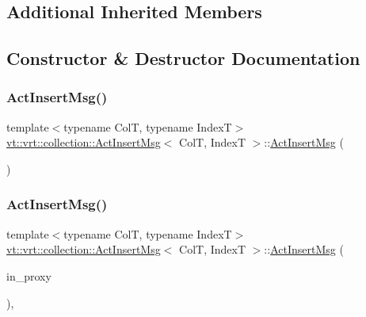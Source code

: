 \subsection*{Additional Inherited Members}


\subsection{Constructor \& Destructor Documentation}
\mbox{\label{structvt_1_1vrt_1_1collection_1_1_act_insert_msg_acd0c4f8868194e27580d9bf5d748bb14}} 
\subsubsection{\texorpdfstring{Act\+Insert\+Msg()}{ActInsertMsg()}\hspace{0.1cm}{\footnotesize\ttfamily [1/2]}}
{\footnotesize\ttfamily template$<$typename ColT, typename IndexT$>$ \\
\hyperlink{structvt_1_1vrt_1_1collection_1_1_act_insert_msg}{vt\+::vrt\+::collection\+::\+Act\+Insert\+Msg}$<$ ColT, IndexT $>$\+::\hyperlink{structvt_1_1vrt_1_1collection_1_1_act_insert_msg}{Act\+Insert\+Msg} (\begin{DoxyParamCaption}{ }\end{DoxyParamCaption})\hspace{0.3cm}{\ttfamily [default]}}

\mbox{\label{structvt_1_1vrt_1_1collection_1_1_act_insert_msg_a26f5c8527a3fd30ece4ef661ebb41798}} 
\subsubsection{\texorpdfstring{Act\+Insert\+Msg()}{ActInsertMsg()}\hspace{0.1cm}{\footnotesize\ttfamily [2/2]}}
{\footnotesize\ttfamily template$<$typename ColT, typename IndexT$>$ \\
\hyperlink{structvt_1_1vrt_1_1collection_1_1_act_insert_msg}{vt\+::vrt\+::collection\+::\+Act\+Insert\+Msg}$<$ ColT, IndexT $>$\+::\hyperlink{structvt_1_1vrt_1_1collection_1_1_act_insert_msg}{Act\+Insert\+Msg} (\begin{DoxyParamCaption}\item[{\hyperlink{structvt_1_1vrt_1_1collection_1_1_collection_proxy}{Collection\+Proxy}$<$ ColT, IndexT $>$}]{in\+\_\+proxy }\end{DoxyParamCaption})\hspace{0.3cm}{\ttfamily [inline]}, {\ttfamily [explicit]}}



